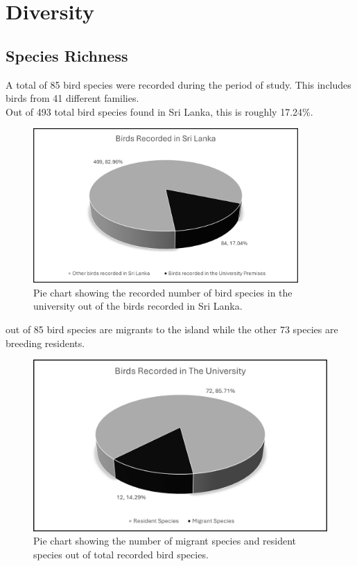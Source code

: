 \chapter{Diversity}
\label{cp:Diversity}

\section{Species Richness}
A total of 85 bird species were recorded during the period of study. This includes birds from 41 different families.\\
Out of 493 total bird species found in Sri Lanka, this is roughly 17.24\%.

\begin{figure}[!htpb]
    \centering
    \includegraphics[width=0.9\textwidth]{Figures/pieChart1.png}
    \caption[]{Pie chart showing the recorded number of bird species in the university out of the birds recorded in Sri Lanka.}
    \label{fig:figure-01}
\end{figure}
 out of 85 bird species are migrants to the island while the other 73 species are breeding residents. 

\begin{figure}[!htpb]
    \centering
    \includegraphics[width=\linewidth]{Figures/pieChart2.png}
    \caption[]{Pie chart showing the number of migrant species and resident species out of total recorded bird species.}
    \label{fig:figure-01}
\end{figure}
